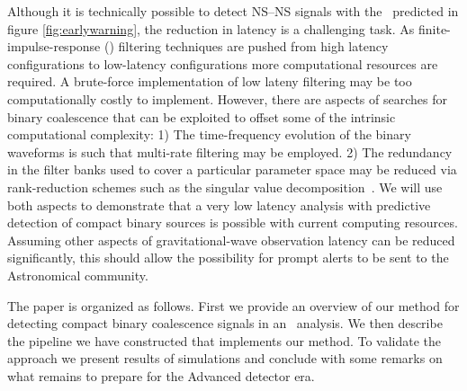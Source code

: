 Although it is technically possible to detect NS--NS signals with the
\earlywarning\ predicted in figure \ref{fig:earlywarning}, the reduction in
latency is a challenging task.  As finite-impulse-response (\fir) filtering
techniques are pushed from high latency configurations to low-latency
configurations more computational resources are required.  A brute-force
implementation of low lateny filtering may be too computationally costly to
implement.  However, there are aspects of searches for binary coalescence that
can be exploited to offset some of the intrinsic computational complexity: 1)
The time-frequency evolution of the binary waveforms is such that multi-rate
filtering may be employed. 2) The redundancy in the filter banks used to cover
a particular parameter space may be reduced via rank-reduction schemes such as
the singular value decomposition~\cite{Cannon:2010p10398}. We will use both
aspects to demonstrate that a very low latency analysis with predictive
detection of compact binary sources is possible with current computing
resources.  Assuming other aspects of gravitational-wave observation latency
can be reduced significantly, this should allow the possibility for prompt
alerts to be sent to the Astronomical community.

The paper is organized as follows. First we provide an overview of our method
for detecting compact binary coalescence signals in an \earlywarning\
analysis. We then describe the pipeline we have constructed that implements
our method.  To validate the approach we present results of simulations and
conclude with some remarks on what remains to prepare for the Advanced
detector era.

